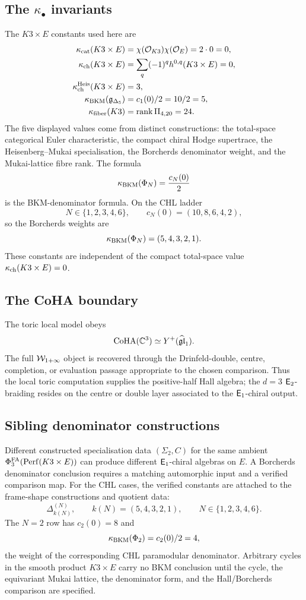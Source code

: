 \subsection*{The \texorpdfstring{\(\kappa_\bullet\)}{subscripted} invariants}

The \(K3\times E\) constants used here are
\[
\begin{aligned}
  \kappa_{\mathrm{cat}}(K3\times E)
    &= \chi(\mathcal{O}_{K3})\chi(\mathcal{O}_E)
     = 2\cdot 0
     = 0,\\
  \kappa_{\mathrm{ch}}(K3\times E)
    &= \sum_q(-1)^q h^{0,q}(K3\times E)
     = 0,\\
  \kappa_{\mathrm{ch}}^{\mathrm{Heis}}(K3\times E)
    &= 3,\\
  \kappa_{\mathrm{BKM}}(\mathfrak{g}_{\Delta_5})
    &= c_1(0)/2
     = 10/2
     = 5,\\
  \kappa_{\mathrm{fiber}}(K3)
    &= \operatorname{rank}\mathrm{II}_{4,20}
     = 24.
\end{aligned}
\]
The five displayed values come from distinct constructions: the
total-space categorical Euler
characteristic, the compact chiral Hodge supertrace, the
Heisenberg--Mukai specialisation, the Borcherds denominator weight, and
the Mukai-lattice fibre rank.  The formula
\[
  \kappa_{\mathrm{BKM}}(\Phi_N)=\frac{c_N(0)}{2}
\]
is the BKM-denominator formula.  On the CHL ladder
\[
  N\in\{1,2,3,4,6\},\qquad
  c_N(0)=(10,8,6,4,2),
\]
so the Borcherds weights are
\[
  \kappa_{\mathrm{BKM}}(\Phi_N)=(5,4,3,2,1).
\]
These constants are independent of the compact total-space value
\(\kappa_{\mathrm{ch}}(K3\times E)=0\).

\subsection*{The CoHA boundary}

The toric local model obeys
\[
  \mathrm{CoHA}(\mathbb C^3)\simeq Y^+(\widehat{\mathfrak{gl}}_1).
\]
The full \(\mathcal{W}_{1+\infty}\) object is recovered through the
Drinfeld-double, centre, completion, or evaluation passage appropriate
to the chosen comparison.  Thus the local toric computation supplies
the positive-half Hall algebra; the \(d=3\) \(\mathsf{E}_2\)-braiding resides
on the centre or double layer associated to the \(\mathsf{E}_1\)-chiral output.

\subsection*{Sibling denominator constructions}

Different constructed specialisation data \((\Sigma_2,C)\) for the
same ambient \(\Phi^{\mathrm{FA}}_3(\mathrm{Perf}(K3\times E))\) can produce different
\(\mathsf{E}_1\)-chiral algebras on \(E\).  A Borcherds denominator conclusion
requires a matching automorphic input and a verified comparison map.
For the CHL cases, the verified constants are attached to the
frame-shape constructions and quotient data:
\[
  \Delta^{(N)}_{k(N)},\qquad
  k(N)=(5,4,3,2,1),\qquad
  N\in\{1,2,3,4,6\}.
\]
The \(N=2\) row has \(c_2(0)=8\) and
\[
  \kappa_{\mathrm{BKM}}(\Phi_2)=c_2(0)/2=4,
\]
the weight of the corresponding CHL paramodular denominator.  Arbitrary
cycles in the smooth product \(K3\times E\) carry no BKM conclusion
until the cycle, the equivariant Mukai lattice, the denominator form,
and the Hall/Borcherds comparison are specified.

